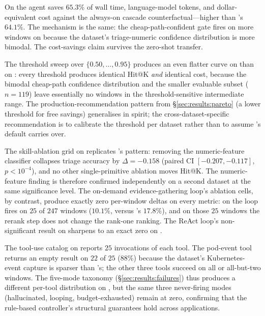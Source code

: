  On \dsotel{} the agent saves $65.3\%$ of wall time, language-model tokens, and dollar-equivalent cost against the always-on cascade counterfactual---higher than \dsob{}'s $64.1\%$. The mechanism is the same: the cheap-path-confident gate fires on more windows on \dsotel{} because the dataset's triage-numeric confidence distribution is more bimodal. The cost-savings claim survives the zero-shot transfer.

 The threshold sweep over $\{0.50, \ldots, 0.95\}$ produces an even flatter curve on \dsotel{} than on \dsob{}: every threshold produces identical Hit@K \emph{and} identical cost, because the bimodal cheap-path confidence distribution and the smaller evaluable subset ($n=119$) leave essentially no windows in the threshold-sensitive intermediate range. The production-recommendation pattern from \S\ref{sec:results:pareto} (a lower threshold for free savings) generalises in spirit; the cross-dataset-specific recommendation is to calibrate the threshold per dataset rather than to assume \dsob{}'s default carries over.

 The skill-ablation grid on \dsotel{} replicates \dsob{}'s pattern: removing the numeric-feature classifier collapses triage accuracy by $\Delta = -0.158$ (paired CI $[-0.207, -0.117]$, $p < 10^{-4}$), and no other single-primitive ablation moves Hit@K. The numeric-feature finding is therefore confirmed independently on a second dataset at the same significance level. The on-demand evidence-gathering loop's ablation cells, by contrast, produce exactly zero per-window deltas on every metric: on \dsotel{} the loop fires on $25$ of $247$ windows ($10.1\%$, versus \dsob{}'s $17.8\%$), and on those $25$ windows the rerank step does not change the rank-one ranking. The ReAct loop's non-significant result on \dsob{} sharpens to an exact zero on \dsotel{}.

 The tool-use catalog on \dsotel{} reports $25$ invocations of each tool. The pod-event tool returns an empty result on $22$ of $25$ ($88\%$) because the dataset's Kubernetes-event capture is sparser than \dsob{}'s; the other three tools succeed on all or all-but-two windows. The five-mode taxonomy (\S\ref{sec:results:failures}) thus produces a different per-tool distribution on \dsotel{}, but the same three never-firing modes (hallucinated, looping, budget-exhausted) remain at zero, confirming that the rule-based controller's structural guarantees hold across applications.

